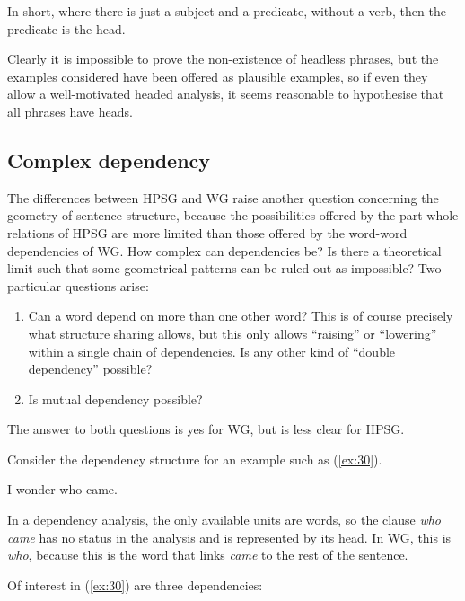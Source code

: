 \documentclass[output=paper,biblatex,babelshorthands,newtxmath,draftmode,colorlinks,citecolor=brown]{langscibook}
\begin{document}
\noindent
In short, where there is just a subject and a predicate, without a verb, then the predicate is the
head.

Clearly it is impossible to prove the non-existence of headless phrases, but the examples considered
have been offered as plausible examples, so if even they allow a well-motivated headed analysis, it
seems reasonable to hypothesise that all phrases have heads.


\subsection{Complex dependency}
\label{sec:5.2}\label{dg-sec-complex-dependency}

The differences between HPSG and WG raise another question concerning the geometry of sentence structure, because the possibilities offered by the part-whole relations of HPSG are more limited than those offered by the word-word dependencies of WG. How complex can dependencies be? Is there a theoretical limit such that some geometrical patterns can be ruled out as impossible? Two particular questions arise:

\begin{enumerate}
	\item \label{it:4} Can a word depend on more than one other word? This is of course precisely what structure sharing allows, but this only allows ``raising'' or ``lowering'' within a single chain of dependencies. Is any other kind of ``double dependency'' possible?
	
	\item \label{it:5} Is mutual dependency possible?
\end{enumerate}

\noindent
The answer to both questions is yes for WG, but is less clear for HPSG.

Consider the dependency structure for an example such as (\ref{ex:30}).

\begin{exe}
	\ex \label{ex:30} I wonder who came.
\end{exe}
	
\noindent
In a dependency analysis, the only available units are words, so the clause \emph{who came} has no status in the analysis and is represented by its head. In WG, this is \emph{who}, because this is the word that links \emph{came} to the rest of the sentence.

Of interest in (\ref{ex:30}) are three dependencies:
\end{document}

